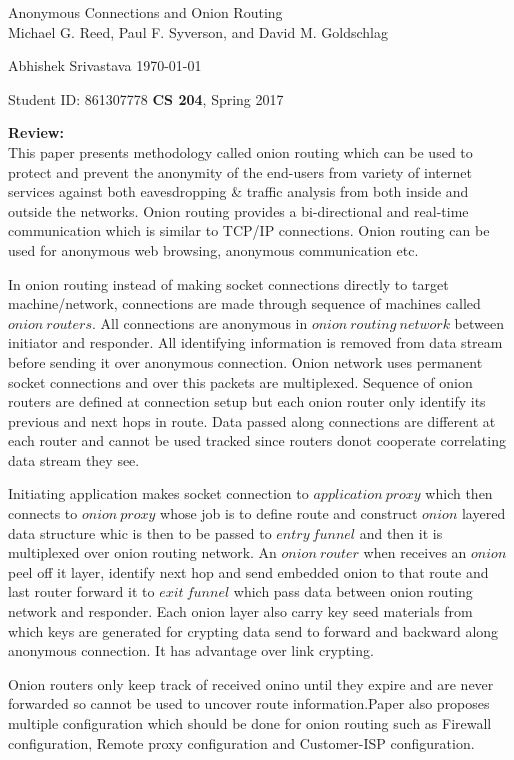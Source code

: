 \documentclass[a4paper,12pt, twoside]{article}
\renewcommand{\maketitle}{%
 	\Large
 	\begin{center}
 	Anonymous Connections and Onion Routing\\	
 	\normalsize Michael G. Reed, Paul F. Syverson, and David M. Goldschlag
 	\end{center}
 
 	\Large
	Abhishek Srivastava
	\hfill
	\normalsize
	\today
 	\par
 	Student ID: 861307778
 	\hfill
 	\textbf{CS 204}, Spring 2017
 	\par 	
 	\hrulefill
 	\par
 	}
\begin{document}
\thispagestyle{empty}
	
\maketitle

\textbf{Review:}\\

This paper presents methodology called onion routing which can be used to protect and prevent the anonymity of the end-users from variety of internet services against both eavesdropping \& traffic analysis from both inside and outside the networks. Onion routing provides a bi-directional and real-time communication which is similar to TCP/IP connections. Onion routing can be used for anonymous web browsing, anonymous communication etc.

In onion routing instead of making socket connections directly to target machine/network, connections are made through sequence of machines called $onion~routers$. All connections are anonymous in $onion~routing~network$ between initiator and responder. All identifying information is removed from data stream before sending it over anonymous connection. Onion network uses permanent socket connections and over this packets are multiplexed. Sequence of onion routers are defined at connection setup but each onion router only identify its previous and next hops in route. Data passed along connections are different at each router and cannot be used tracked since routers donot cooperate correlating data stream they see.

Initiating application makes socket connection to $application~proxy$  which then connects to $onion~proxy$ whose job is to define route and construct $onion$ layered data structure whic is then to be passed to $entry~funnel$ and then it is multiplexed over onion routing network. An $onion~router$ when receives an $onion$ peel off it layer, identify next hop and send embedded onion to that route and last router forward it to $exit~funnel$ which pass data between onion routing network and responder. Each onion layer also carry key seed materials from which keys are generated for crypting data send to forward and backward along anonymous connection. It has advantage over link crypting.

Onion routers only keep track of received onino until they expire and are never forwarded so cannot be used to uncover route information.Paper also proposes multiple configuration which should be done for onion routing such as Firewall configuration, Remote proxy configuration and Customer-ISP configuration.\\
\end{document}
